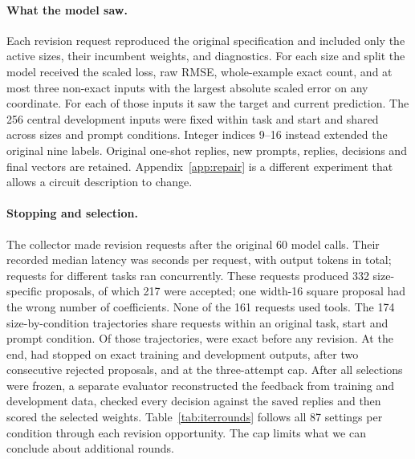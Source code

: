 \paragraph{What the model saw.} Each revision request reproduced the original specification and included only the active sizes, their incumbent weights, and diagnostics. For each size and split the model received the scaled loss, raw RMSE, whole-example exact count, and at most three non-exact inputs with the largest absolute scaled error on any coordinate. For each of those inputs it saw the target and current prediction. The 256 central development inputs were fixed within task and start and shared across sizes and prompt conditions. Integer indices 9--16 instead extended the original nine labels. Original one-shot replies, new prompts, replies, decisions and final vectors are retained. Appendix~\ref{app:repair} is a different experiment that allows a circuit description to change.
\paragraph{Stopping and selection.} The collector made \revCalls{} revision requests after the original 60 model calls. Their recorded median latency was \latencySec{} seconds per request, with \outputTokens{} output tokens in total; requests for different tasks ran concurrently. These requests produced 332 size-specific proposals, of which 217 were accepted; one width-16 square proposal had the wrong number of coefficients. None of the 161 requests used tools. The 174 size-by-condition trajectories share requests within an original task, start and prompt condition. Of those trajectories, \zeroStops{} were exact before any revision. At the end, \exactStops{} had stopped on exact training and development outputs, \patienceStops{} after two consecutive rejected proposals, and \budgetStops{} at the three-attempt cap. After all selections were frozen, a separate evaluator reconstructed the feedback from training and development data, checked every decision against the saved replies and then scored the selected weights. Table~\ref{tab:iterrounds} follows all 87 settings per condition through each revision opportunity. The cap limits what we can conclude about additional rounds.
